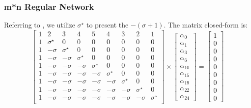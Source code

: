 \subsubsection{m*n Regular Network}
Referring to , we utilize ${\sigma}^{\star}$ to present the $-(\sigma + 1)$.  The matrix closed-form is:
\begin{equation}
{
\left[ \begin{array}{ccccccccc}
1 & 2 & 3 & 4 & 5 & 4 & 3 & 2 & 1\\
1 & {\sigma}^{\star} & 0 & 0 & 0 & 0 & 0 & 0 & 0\\
1 & -\sigma & {\sigma}^{\star} & 0 & 0 & 0 & 0& 0 & 0 \\
1 & -\sigma & -\sigma & {\sigma}^{\star} & 0 &0 & 0 & 0 & 0 \\
1 & -\sigma & -\sigma & -\sigma & {\sigma}^{\star} & 0 & 0 & 0 & 0\\
1 & -\sigma & -\sigma & -\sigma & -\sigma & {\sigma}^{\star} & 0 & 0 & 0\\
1 & -\sigma & -\sigma & -\sigma & -\sigma & -\sigma & {\sigma}^{\star} & 0 & 0\\
1 & -\sigma & -\sigma & -\sigma & -\sigma & -\sigma & -\sigma & {\sigma}^{\star} &0\\
1 & -\sigma & -\sigma & -\sigma & -\sigma & -\sigma & -\sigma & -\sigma & {\sigma}^{\star}\\
\end{array} 
\right ]} \times \left[ \begin{array}{c}
\alpha_{0} \\
\alpha_{1} \\
\alpha_{3} \\
\alpha_{6} \\
\alpha_{10} \\
\alpha_{15}\\
\alpha_{19}\\
\alpha_{22}\\
\alpha_{24}
\end{array} 
\right ] = \left[ \begin{array}{c}
1 \\
0 \\
0 \\
0 \\
0\\
0\\
0\\
0\\
0
\end{array} 
\right ]
\end{equation}
\newpage

